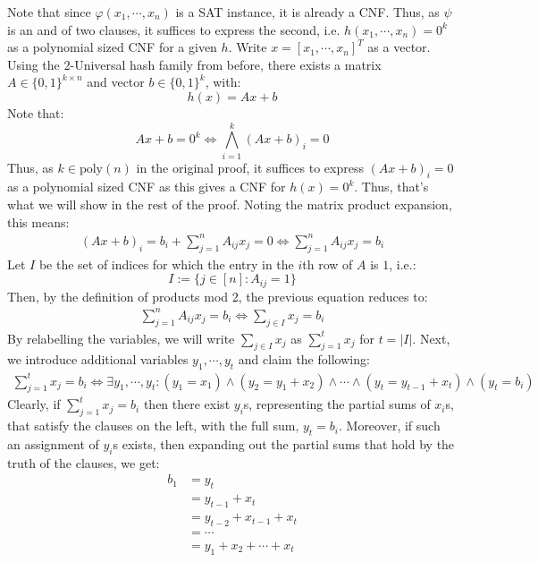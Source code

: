 \documentclass[12pt]{article}
\begin{document}
\begin{solution}
    Note that since $\varphi(x_1, \cdots, x_n)$ is a SAT instance, it is already a CNF. Thus, as $\psi$ is an and of two clauses, it suffices to express the second, i.e. $h(x_1, \cdots, x_n) = 0^k$ as a polynomial sized CNF for a given $h$. \bbni 
    Write $x = [x_1, \cdots, x_n]^T$ as a vector. Using the $2$-Universal hash family from before, there exists a matrix \(A \in \{0,1\}^{k \times n}\) and vector \(b \in \{0,1\}^k\), with: 
    \[ h(x) = Ax + b \]
    Note that: 
    \[ Ax+b = 0^k \iff \bigwedge_{i=1}^k (Ax+b)_i = 0 \]
    Thus, as $k \in \text{poly}(n)$ in the original proof, it suffices to express $(Ax+b)_i = 0$ as a polynomial sized CNF as this gives a CNF for $h(x) = 0^k$. Thus, that's what we will show in the rest of the proof. \bbni
    Noting the matrix product expansion, this means: 
    \begin{align*}
        (Ax+b)_i = b_i + \sum_{j=1}^n A_{ij}x_j = 0 \iff \sum_{j=1}^n A_{ij}x_j = b_i
    \end{align*}
    Let $I$ be the set of indices for which the entry in the $i$th row of $A$ is $1$, i.e.: 
    \[ I := \{ j \in [n] : A_{ij} = 1 \}\]
    Then, by the definition of products mod 2, the previous equation reduces to: 
        \begin{align*}
        \sum_{j=1}^n A_{ij}x_j = b_i \iff \sum_{j \in I} x_j = b_i
    \end{align*}
    By relabelling the variables, we will write $\sum_{j \in I} x_j$ as $\sum_{j = 1}^t x_j$ for $t = |I|$. Next, we introduce additional variables $y_1, \cdots, y_t$ and claim the following: 
    \begin{align*}
        \sum_{j = 1}^t x_j = b_i \iff \exists y_1, \cdots, y_t : (y_1 = x_1) \land (y_2 = y_1 + x_2) \land \cdots \land (y_t = y_{t-1} + x_t) \land (y_t = b_i) 
    \end{align*} 
    Clearly, if $\sum_{j = 1}^t x_j = b_i$ then there exist $y_i$s, representing the partial sums of $x_i$s, that satisfy the clauses on the left, with the full sum, $y_t = b_i$. Moreover, if such an assignment of $y_i$s exists, then expanding out the partial sums that hold by the truth of the clauses, we get: 
    \begin{align*}
        b_1 &= y_t  \\
        &= y_{t-1} + x_t \\
        &= y_{t-2} + x_{t-1} + x_{t} \\
        &= \cdots \\
        &= y_1 + x_2 + \cdots + x_t \\

\end{align*}
\end{solution}
\end{document}
